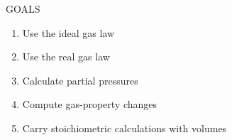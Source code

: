 \documentclass[main.tex]{subfiles}
\begin{document}
\begin{marginfigure}%
\begin{mytcbox}{GOALS}
\begin{enumerate}[label=\protect\circled{\color{white}\arabic*}]
\item Use the ideal gas law
\item Use the real gas law
\item Calculate partial pressures
\item Compute gas-property changes
\item Carry  stoichiometric calculations with volumes
\end{enumerate}
\end{mytcbox}
\end{marginfigure}%
\end{document}
